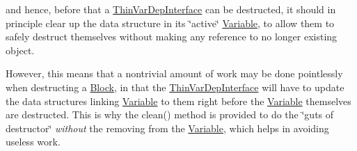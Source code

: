 and hence, before that a \mbox{\hyperlink{class_s_m_spp__di__unipi__it_1_1_thin_var_dep_interface}{Thin\+Var\+Dep\+Interface}} can be destructed, it should in principle clear up the data structure in its \char`\"{}active\char`\"{} \mbox{\hyperlink{class_s_m_spp__di__unipi__it_1_1_variable}{Variable}}, to allow them to safely destruct themselves without making any reference to no longer existing object.

However, this means that a nontrivial amount of work may be done pointlessly when destructing a \mbox{\hyperlink{class_s_m_spp__di__unipi__it_1_1_block}{Block}}, in that the \mbox{\hyperlink{class_s_m_spp__di__unipi__it_1_1_thin_var_dep_interface}{Thin\+Var\+Dep\+Interface}} will have to update the data structures linking \mbox{\hyperlink{class_s_m_spp__di__unipi__it_1_1_variable}{Variable}} to them right before the \mbox{\hyperlink{class_s_m_spp__di__unipi__it_1_1_variable}{Variable}} themselves are destructed. This is why the clean() method is provided to do the \char`\"{}guts of destructor\char`\"{} {\itshape without} the removing from the \mbox{\hyperlink{class_s_m_spp__di__unipi__it_1_1_variable}{Variable}}, which helps in avoiding useless work. 